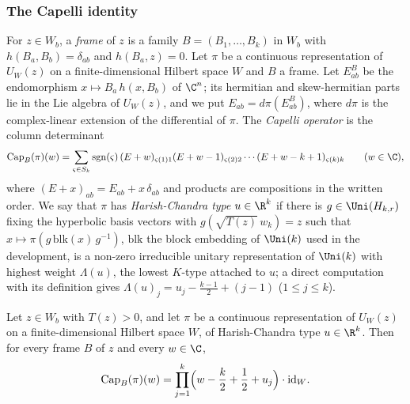 \subsubsection{The Capelli identity}\label{sec:pf:thmS:capelli}

For $z\in W_b$, a \emph{frame} of $z$ is a family $B=(B_1,\dots,B_k)$ in $W_b$ with $h(B_a,B_b)=\delta_{ab}$ and $h(B_a,z)=0$.
Let $\pi$ be a continuous representation of $U_W(z)$ on a finite-dimensional Hilbert space $W$ and $B$ a frame. Let $E^B_{ab}$
be the endomorphism $x\mapsto B_a\,h(x,B_b)$ of $\C^n$; its hermitian and skew-hermitian parts lie in the Lie algebra of
$U_W(z)$, and we put $E_{ab}=d\pi(E^B_{ab})$, where $d\pi$ is the complex-linear extension of the differential of $\pi$. The
\emph{Capelli operator} is the column determinant
\[
\mathrm{Cap}_B(\pi)(w)=\sum_{\varsigma\in S_k}\operatorname{sgn}(\varsigma)\,(E+w)_{\varsigma(1)1}(E+w-1)_{\varsigma(2)2}\cdots
(E+w-k+1)_{\varsigma(k)k}\qquad(w\in\C),
\]
where $(E+x)_{ab}=E_{ab}+x\,\delta_{ab}$ and products are compositions in the written order. We say that $\pi$ has
\emph{Harish-Chandra type} $u\in\R^k$ if there is $g\in\Uni(H_{k,r})$ fixing the hyperbolic basis vectors with
$g(\sqrt{T(z)}\,w_k)=z$ such that $x\mapsto\pi(g\,\mathrm{blk}(x)\,g^{-1})$, $\mathrm{blk}$ the block embedding of $\Uni(k)$ used in
the development, is a non-zero irreducible unitary representation of $\Uni(k)$ with highest weight $\Lambda(u)$, the lowest
$K$-type attached to $u$; a direct computation with its definition gives $\Lambda(u)_j=u_j-\frac{k-1}2+(j-1)$ ($1\le j\le k$).

\begin{theorem}\label{pf:thmS:capelli}
Let $z\in W_b$ with $T(z)>0$, and let $\pi$ be a continuous representation of $U_W(z)$ on a finite-dimensional Hilbert space $W$,
of Harish-Chandra type $u\in\R^k$. Then for every frame $B$ of $z$ and every $w\in\C$,
\[
\mathrm{Cap}_B(\pi)(w)=\prod_{j=1}^k\Bigl(w-\frac k2+\frac12+u_j\Bigr)\cdot\mathrm{id}_W.
\]
\end{theorem}

